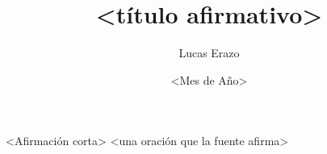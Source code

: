 
\renewcommand{\talkfooter}{<tema corto> \; · \; <método>}
\title[<tema corto>]{<título afirmativo>}
\author{Lucas Erazo}
\date{<Mes de Año>}



\begin{frame}[plain]
  \titlepage
\end{frame}

%

\begin{frame}{<Afirmación corta>}
  <una oración que la fuente afirma>

  \vfill
\end{frame}




